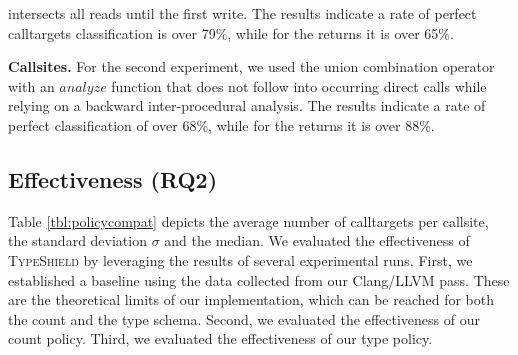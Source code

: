 \begin{table*}[htbp!]
\begin{center}
{\begin{tabular}{l|r|rcl|r|rcl|r|rcl|r|rcl|r}
    	\end{tabular}

}
	\caption {Results for allowed callsites per calltarget for several programs compiled with 
	Clang using optimization level \texttt{-O2}. Note that the basic restriction to address taken only calltargets (see column AT) is 
	present for each other series. The label $count^*$ denotes the best possible reduction using our \emph{count} policy 
	based on the ground truth collected by our Clang/LLVM pass, while $count$ denotes the results of our implementation of 
	the \emph{count} policy derived from the binaries. The same applies to $type*$ and $type$ regarding the \emph{type} policy. 
	A lower number of calltargets per callsite indicates better results. Note that our \emph{type} policy is superior to 
	the \emph{count} policy, as it allows for a stronger reduction of allowed calltargets. 
	We consider this a good result which further improves the state-of-the-art. 
	Finally, we provide the median and the pair of mean and standard deviation to allow for a 
	better comparison with other state-of-the-art tools.
        }
	\label{tbl:policycompat}
\end{center}
\end{table*}
intersects all reads until the first write.
The results indicate a rate of perfect calltargets classification is over 79\%, while for the returns it is over 65\%.

\textbf{Callsites.} 
For the second experiment, we used the union combination operator with an $analyze$ function that does not follow into occurring direct calls while relying on a backward inter-procedural analysis.
The results indicate a rate of perfect classification of over 68\%, while for the returns it is over 88\%.

\subsection{Effectiveness (RQ2)}
\label{section:typeshieldeffectiveness}
Table \ref{tbl:policycompat} depicts the average number of calltargets per callsite, the standard deviation $\sigma$ and the median. 
We evaluated the effectiveness of \textsc{TypeShield} by leveraging the results of several experimental runs.
First, we established a baseline using the data collected from our Clang/LLVM pass. These are the theoretical limits of our implementation, which can be reached for both the {count} and the {type} schema. 
Second, we evaluated the effectiveness of our {count} policy. Third, we evaluated the effectiveness of our {type} policy. 

